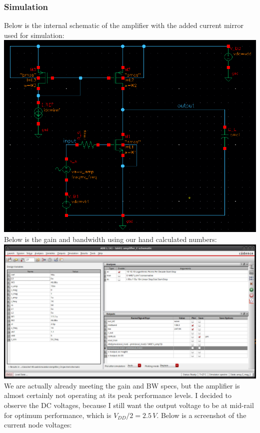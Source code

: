 \documentclass[12pt, fleqn]{article}
\begin{document}
\subsubsection{Simulation}
Below is the internal schematic of the amplifier with the added current mirror used for simulation:\\[0.1cm]
\includegraphics[scale=0.4, center]{d_internal.png}\\[0.25cm]
Below is the gain and bandwidth using our hand calculated numbers:\\[0.1cm]
\includegraphics[scale=0.3, center]{d_gain_bw_init.png}
\newpage\noindent
We are actually already meeting the gain and BW specs, but the amplifier is almost certainly not operating at its peak performance levels.  I decided to observe the DC voltages, because I still want the output voltage to be at mid-rail for optimum performance, which is $V_{DD} / 2 = 2.5\,V$.  Below is a screenshot of the current node voltages:\\[0.1cm]
\end{document}
